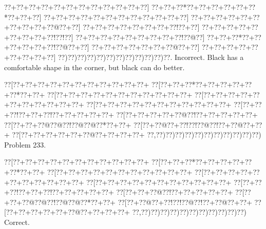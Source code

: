 \documentclass[a5paper]{article}
\begin{document}
\begin{center}
{\goo
\0??+\0??+\0??+\0??+\0??+\0??+\0??+\0??+\0??+\0??+\0??+\0??]
\0??+\0??+\0??*\0??+\0??+\0??+\0??+\0??+\0??*\0??+\0??+\0??]
\0??+\0??+\0??+\0??+\0??+\0??+\0??+\0??+\0??+\0??+\0??+\0??]
\0??+\0??+\0??+\0??+\0??+\0??+\0??+\0??+\0??+\0??@\0??+\0??]
\0??+\0??+\0??+\0??+\0??+\0??+\0??+\0??!\0??+\0??]
\0??+\0??+\0??+\0??+\0??+\0??+\0??+\0??+\0??!\0??!\0??]
\0??+\0??+\0??+\0??+\0??+\0??+\0??+\0??+\0??!\0??@\0??]
\0??+\0??+\0??*\0??+\0??+\0??+\0??+\0??+\0??!\0??@\0??+\0??]
\0??+\0??+\0??+\0??+\0??+\0??+\0??@\0??+\0??]
\0??+\0??+\0??+\0??+\0??+\0??+\0??+\0??+\0??]
\0??)\0??)\0??)\0??)\0??)\0??)\0??)\0??)\0??)\0??)\0??)\0??.
}
Incorrect. Black has a comfortable shape in the corner, but black can do better.

\end{center}
\newpage
\begin{center}
{\goo
\0??[\0??+\0??+\0??+\0??+\0??+\0??+\0??+\0??+\0??+\0??+\0??+
\0??[\0??+\0??+\0??*\0??+\0??+\0??+\0??+\0??+\0??*\0??+\0??+
\0??[\0??+\0??+\0??+\0??+\0??+\0??+\0??+\0??+\0??+\0??+\0??+
\0??[\0??+\0??+\0??+\0??+\0??+\0??+\0??+\0??+\0??+\0??+\0??+
\0??[\0??+\0??+\0??+\0??+\0??+\0??+\0??+\0??+\0??+\0??+\0??+
\0??[\0??+\0??+\0??!\0??+\0??+\0??!\0??+\0??+\0??+\0??+\0??+
\0??[\0??+\0??+\0??+\0??+\0??@\0??!\0??+\0??+\0??+\0??+\0??+
\0??[\0??+\0??+\0??@\0??@\0??!\0??@\0??@\0??*\0??+\0??+
\0??[\0??+\0??@\0??+\0??!\0??!\0??@\0??!\0??+\0??@\0??+\0??+
\0??[\0??+\0??+\0??+\0??+\0??+\0??@\0??+\0??+\0??+\0??+
\0??,\0??)\0??)\0??)\0??)\0??)\0??)\0??)\0??)\0??)\0??)\0??)
}
Problem 233.

\end{center}
\begin{center}
{\goo
\0??[\0??+\0??+\0??+\0??+\0??+\0??+\0??+\0??+\0??+\0??+\0??+
\0??[\0??+\0??+\0??*\0??+\0??+\0??+\0??+\0??+\0??*\0??+\0??+
\0??[\0??+\0??+\0??+\0??+\0??+\0??+\0??+\0??+\0??+\0??+\0??+
\0??[\0??+\0??+\0??+\0??+\0??+\0??+\0??+\0??+\0??+\0??+\0??+
\0??[\0??+\0??+\0??+\0??+\0??+\0??+\0??+\0??+\0??+\0??+\0??+
\0??[\0??+\0??+\0??!\0??+\0??+\0??!\0??+\0??+\0??+\0??+\0??+
\0??[\0??+\0??+\0??@\0??!\0??+\0??+\0??+\0??+\0??+
\0??[\0??+\0??+\0??@\0??@\0??!\0??@\0??@\0??*\0??+\0??+
\0??[\0??+\0??@\0??+\0??!\0??!\0??@\0??!\0??+\0??@\0??+\0??+
\0??[\0??+\0??+\0??+\0??+\0??+\0??@\0??+\0??+\0??+\0??+
\0??,\0??)\0??)\0??)\0??)\0??)\0??)\0??)\0??)\0??)\0??)\0??)
}
Correct. 

\end{center}
\end{document}
